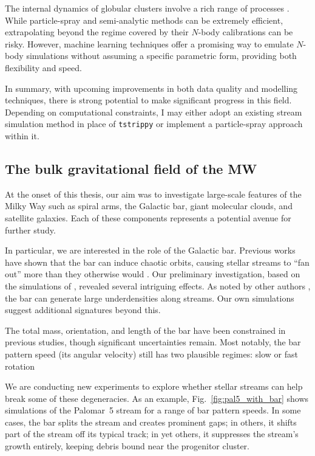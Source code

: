         The internal dynamics of globular clusters involve a rich range of processes \citep{1997A&ARv...8....1M}. While particle-spray and semi-analytic methods can be extremely efficient, extrapolating beyond the regime covered by their $N$-body calibrations can be risky. However, machine learning techniques \citep{2023ApJ...959...99T} offer a promising way to emulate $N$-body simulations without assuming a specific parametric form, providing both flexibility and speed.

        In summary, with upcoming improvements in both data quality and modelling techniques, there is strong potential to make significant progress in this field. Depending on computational constraints, I may either adopt an existing stream simulation method in place of \texttt{tstrippy} or implement a particle-spray approach within it.

    \subsection{The bulk gravitational field of the MW}
        At the onset of this thesis, our aim was to investigate large-scale features of the Milky Way such as spiral arms, the Galactic bar, giant molecular clouds, and satellite galaxies. Each of these components represents a potential avenue for further study.  

        In particular, we are interested in the role of the Galactic bar. Previous works have shown that the bar can induce chaotic orbits, causing stellar streams to ``fan out'' more than they otherwise would \citep{2016ApJ...824..104P,2020ApJ...889...70B}. Our preliminary investigation, based on the simulations of \citet{2023A&A...673A..44F}, revealed several intriguing effects. As noted by other authors \citep[see Fig.~9 of][]{2025NewAR.10001713B}, the bar can generate large underdensities along streams. Our own simulations suggest additional signatures beyond this.  

        The total mass, orientation, and length of the bar have been constrained in previous studies, though significant uncertainties remain. Most notably, the bar pattern speed (its angular velocity) still has two plausible regimes: slow or fast rotation \citep{2015MNRAS.450.4050W,2016ARA&A..54..529B,2023MNRAS.520.4779L,2024MNRAS.528.3576V} 

        We are conducting new experiments to explore whether stellar streams can help break some of these degeneracies. As an example, Fig.~\ref{fig:pal5_with_bar} shows simulations of the Palomar~5 stream for a range of bar pattern speeds. In some cases, the bar splits the stream and creates prominent gaps; in others, it shifts part of the stream off its typical track; in yet others, it suppresses the stream's growth entirely, keeping debris bound near the progenitor cluster.  


